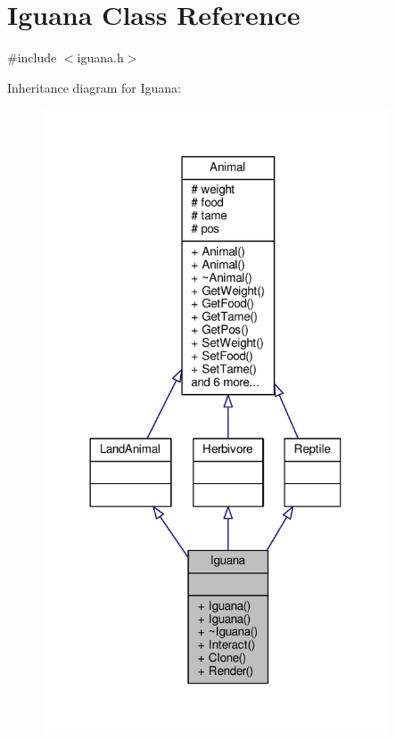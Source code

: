 \hypertarget{classIguana}{}\section{Iguana Class Reference}
\label{classIguana}


{\ttfamily \#include $<$iguana.\+h$>$}



Inheritance diagram for Iguana\+:
\nopagebreak
\begin{figure}[H]
\begin{center}
\leavevmode
\includegraphics[width=291pt]{classIguana__inherit__graph}
\end{center}
\end{figure}


